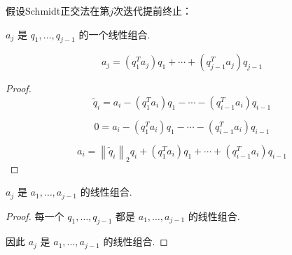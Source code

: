 假设Schmidt正交法在第$j$次迭代提前终止：

\begin{corollary}
    $ a_{j} $ 是 $ q_{1}, \ldots, q_{j-1} $ 的一个线性组合.

$$ a_{j}=\left(q_{1}^{T} a_{j}\right) q_{1}+\cdots+\left(q_{j-1}^{T} a_{j}\right) q_{j-1} $$
\end{corollary}


\begin{proof}
    $$ \widetilde{q}_{i}=a_{i}-\left(q_{1}^{T} a_{i}\right) q_{1}-\cdots-\left(q_{i-1}^{T} a_{i}\right) q_{i-1} $$

    $$ 0=a_{i}-\left(q_{1}^{T} a_{i}\right) q_{1}-\cdots-\left(q_{i-1}^{T} a_{i}\right) q_{i-1} $$

    $$ a_{i}=\left\|\tilde{q}_{i}\right\|_{2} q_{i}+\left(q_{1}^{T} a_{i}\right) q_{1}+\cdots+\left(q_{i-1}^{T} a_{i}\right) q_{i-1} $$
\end{proof}

\begin{corollary}
    $ a_{j} $ 是 $ a_{1}, \ldots, a_{j-1} $ 的线性组合.
\end{corollary}

\begin{proof}
    每一个 $ q_{1}, \ldots, q_{j-1} $ 都是 $ a_{1}, \ldots, a_{j-1} $ 的线性组合.

    因此 $ a_{j} $ 是 $ a_{1}, \ldots, a_{j-1} $ 的线性组合.
\end{proof}
